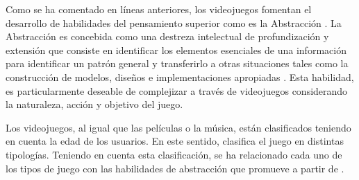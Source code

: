 \documentclass{textolivre}
\begin{document}
Como se ha comentado en líneas anteriores, los videojuegos fomentan el desarrollo de habilidades del pensamiento superior como es la Abstracción \cite{mansilla2017}. %
La Abstracción es concebida como una destreza intelectual de profundización y extensión que consiste en identificar los elementos esenciales de una información para identificar un patrón general y transferirlo a otras situaciones \cite{beas2014} %
tales como la construcción de modelos, diseños e implementaciones apropiadas \cite{serna2011}. %
Esta habilidad, es particularmente deseable de complejizar a través de videojuegos considerando la naturaleza, acción y objetivo del juego.

Los videojuegos, al igual que las películas o la música, están clasificados teniendo en cuenta la edad de los usuarios. En este sentido, \textcite{sedeno2010} %
clasifica el juego en distintas tipologías. Teniendo en cuenta esta clasificación, se ha relacionado cada uno de los tipos de juego con las habilidades de abstracción que promueve  a partir de \textcite{marzano2005}. %
\end{document}
